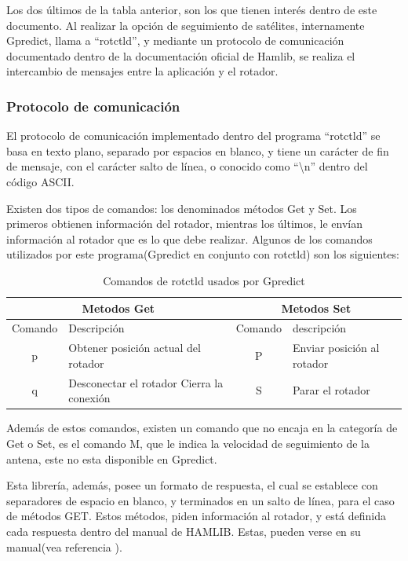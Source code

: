 Los dos últimos de la tabla anterior, son los que tienen interés dentro de este documento. Al realizar la opción de seguimiento de satélites, internamente Gpredict, llama a ``rotctld'', y mediante un protocolo de comunicación documentado dentro de la documentación oficial de Hamlib, se realiza el intercambio de mensajes entre la aplicación y el rotador. 

\subsubsection{Protocolo de comunicación} \label{subsub:protocol_com}
El protocolo de comunicación implementado dentro del programa ``rotctld'' se basa en texto plano, separado por espacios en blanco, y tiene un carácter de fin de mensaje, con el carácter salto de línea, o conocido como ``\textbackslash{}n'' dentro del código ASCII. 

Existen dos tipos de comandos: los denominados métodos Get y Set. Los primeros obtienen información del rotador, mientras los últimos, le envían información al rotador que es lo que debe realizar. Algunos de los comandos utilizados por este programa(Gpredict en conjunto con rotctld) son los siguientes: 

\begin{table}[H]
	\centering
	\begin{tabular}{|c|p{5cm}|c|p{5cm}|}
		\hline
		\multicolumn{2}{|c|}{Metodos Get}  &  \multicolumn{2}{c|}{Metodos Set}  \\ 
		\hline
		Comando & Descripción & Comando & descripción	\\
		\hline
		p & Obtener posición actual del rotador  &P& Enviar posición al rotador \\
		\hline 
		q & Desconectar el rotador 	Cierra la conexión & S & Parar el rotador \\ 
		\hline 	
	\end{tabular}
	\caption{Comandos de rotctld usados por Gpredict} 
	\label{tab:commands_Gpredict}
\end{table}

Además de estos comandos, existen un comando que no encaja en la categoría de Get o Set, es el comando M, que le indica la velocidad de seguimiento de la antena, este no esta disponible en Gpredict. 

Esta librería, además, posee un formato de respuesta, el cual se establece con separadores de espacio en blanco, y terminados en un salto de línea, para el caso de métodos GET. Estos métodos, piden información al rotador, y está definida cada respuesta dentro del manual de HAMLIB. Estas, pueden verse en su manual(vea referencia \cite{HAMLIBDOC}). 


